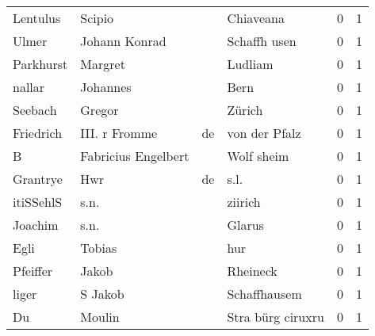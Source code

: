 \begin{center}
\begin{tiny}
\begin{longtabu}{llllrr}
                 Lentulus &                             Scipio &             &                                   Chiaveana &          0 &         1 \\
                    Ulmer &                      Johann Konrad &             &                                Schaffh usen &          0 &         1 \\
                Parkhurst &                            Margret &             &                                     Ludliam &          0 &         1 \\
                   nallar &                           Johannes &             &                                        Bern &          0 &         1 \\
                  Seebach &                             Gregor &             &                                      Zürich &          0 &         1 \\
                Friedrich &                      III. r Fromme &          de &                               von der Pfalz &          0 &         1 \\
                        B &                Fabricius Engelbert &             &                                  Wolf sheim &          0 &         1 \\
                 Grantrye &                                Hwr &          de &                                        s.l. &          0 &         1 \\
                itiSSehlS &                               s.n. &             &                                     ziirich &          0 &         1 \\
                  Joachim &                               s.n. &             &                                      Glarus &          0 &         1 \\
                     Egli &                             Tobias &             &                                         hur &          0 &         1 \\
                 Pfeiffer &                              Jakob &             &                                    Rheineck &          0 &         1 \\
                    liger &                            S Jakob &             &                                Schaffhausem &          0 &         1 \\
                       Du &                             Moulin &             &                           Stra bürg ciruxru &          0 &         1 \\

\end{longtabu}
\end{tiny}
\end{center}
